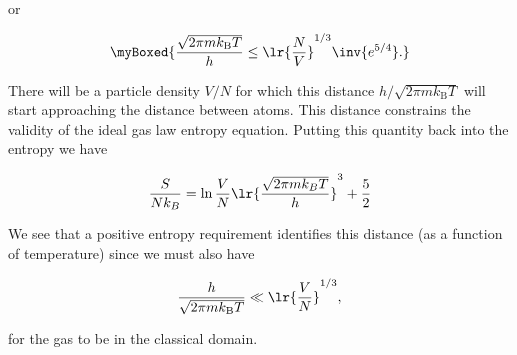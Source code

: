 {or

\begin{equation}\label{eqn:basicStatMechProblemSet4Problem1:140}
\myBoxed{
\frac{\sqrt{2 \pi m k_{\mathrm{B}} T}}{h} \le \lr{\frac{N}{V}}^{1/3} \inv{e^{5/4}}.
}
\end{equation}

There will be a particle density $V/N$ for which this distance $h/\sqrt{2 \pi m k_{\mathrm{B}} T}$ will start approaching the distance between atoms.  This distance constrains the validity of the ideal gas law entropy equation.  Putting this quantity back into the entropy  we have

\begin{equation}\label{eqn:basicStatMechProblemSet4Problem1:n}
\frac{S}{N k_B} = \ln \frac{V}{N} \lr{\frac{\sqrt{2 \pi m k_B T}}{h}}^3 + \frac{5}{2}
\end{equation}

We see that a positive entropy requirement identifies this distance (as a function of temperature) since we must also have

\begin{equation}\label{eqn:basicStatMechProblemSet4Problem1:n}
\frac{h}{\sqrt{2 \pi m k_{\mathrm{B}} T}} \ll \lr{\frac{V}{N}}^{1/3},
\end{equation}

for the gas to be in the classical domain.
}
